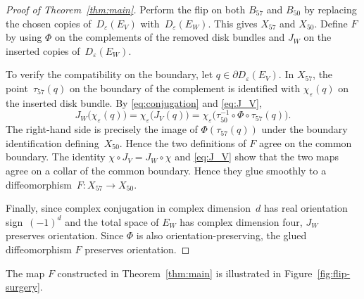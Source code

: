 \documentclass[10pt,a4paper]{amsart}
\numberwithin{equation}{section}
\begin{document}
\begin{proof}[Proof of Theorem~\ref{thm:main}]
    Perform the flip on both $B_{57}$ and $B_{50}$ by replacing the chosen copies of~$D_\varepsilon(E_V)$ with~$D_\varepsilon(E_W)$. 
    This gives $X_{57}$ and $X_{50}$. 
    Define $F$ by using $\Phi$ on the complements of the removed disk bundles and $J_W$ on the inserted copies of~$D_\varepsilon(E_W)$.
    
    To verify the compatibility on the boundary, let $q\in\partial D_\varepsilon(E_V)$. 
    In $X_{57}$, the point~$\tau_{57}(q)$ on the boundary of the complement is identified with $\chi_\varepsilon(q)$ on the inserted disk bundle. By
    \eqref{eq:conjugation} and \eqref{eq:J_V},
    $$
        J_W\bigl(\chi_\varepsilon(q)\bigr)=\chi_\varepsilon\bigl(J_V(q)\bigr)=\chi_\varepsilon\bigl( \tau_{50}^{-1}\circ\Phi\circ\tau_{57}(q) \bigr).
    $$
    The right-hand side is precisely the image of $\Phi(\tau_{57}(q))$ under the boundary identification defining~$X_{50}$. 
    Hence the two definitions of $F$ agree on the common boundary.
    The identity $\chi\circ J_V=J_W\circ\chi$ and \eqref{eq:J_V} show that the two maps agree on a collar of the common boundary. 
    Hence they glue smoothly to a diffeomorphism~$F\colon X_{57}\to X_{50}$.

    Finally, since complex conjugation in complex dimension~$d$ has real orientation sign~$(-1)^d$ and the total space of $E_W$ has complex dimension four, $J_W$ preserves orientation. 
    Since $\Phi$ is also orientation-preserving, the glued diffeomorphism $F$ preserves orientation.
\end{proof}
The map $F$ constructed in Theorem~\ref{thm:main} is illustrated in Figure~\ref{fig:flip-surgery}.
\end{document}
